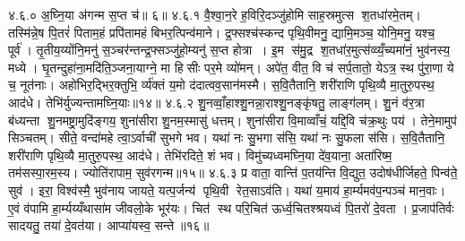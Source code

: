४.६.०
अ॒घ्नि॒या अ॑गन्म स॒प्त च॑॥ ६॥
४.६.१
वै॒श्वा॒न॒रे ह॒विरि॒दञ्जु॑होमि साह॒स्रमुत्स श॒तधा॑रमे॒तम्। तस्मि॑न्ने॒ष पि॒तरं॑ पिताम॒हं प्रपि॑तामहं बिभर॒त्पिन्व॑माने। द्र॒फ्सश्च॑स्कन्द पृथि॒वीमनु॒ द्यामि॒मञ्च॒ योनि॒मनु॒ यश्च॒ पूर्व॑। तृ॒तीय॒य्योंनि॒मनु॑ स॒ञ्चर॑न्तन्द्र॒फ्सञ्जु॑हो॒म्यनु॑ स॒प्त होत्रा। इ॒म स॑मु॒द्र श॒तधा॑र॒मुत्स॑व्व्यँ॒च्यमा॑नं॒ भुव॑नस्य॒ मध्ये। घृ॒तन्दुहा॑ना॒मदि॑ति॒ञ्जना॒याग्ने॒ मा हिसीः पर॒मे व्यो॑मन्। अपे॑त॒ वीत॒ वि च॑ सर्प॒तातो॒ येऽत्र॒ स्थ पु॑रा॒णा ये च॒ नूत॑नाः। अहो॑भिर॒द्भिर॒क्तुभि॒ र्व्य॑क्तं य॒मो द॑दात्वव॒सान॑मस्मै। स॒वि॒तैतानि॒ शरी॑राणि पृथि॒व्यै मा॒तुरु॒पस्थ॒ आद॑धे। तेभि॑र्युज्यन्तामघ्नि॒याः॥१४॥
४.६.२
शु॒नव्वाँ॒हाश्शु॒नन्ना॒राश्शु॒नङ्कृ॑षतु॒ लाङ्ग॑लम्। शु॒नं व॑र॒त्रा ब॑ध्यन्ता शु॒नमष्ट्रा॒मुदि॑ङ्गय॒ शुना॑सीरा शु॒नम॒स्मासु॑ धत्तम्। शुना॑सीरा वि॒माव्वाँचं॒ यद्दि॒वि च॑क्र॒थुः पय॑। तेने॒मामुप॑ सिञ्चतम्। सीते॒ वन्दा॑महे त्वा॒ऽर्वाची॑ सुभगे भव। यथा॑ नः सु॒भगा स॑सि॒ यथा॑ नः सु॒फला स॑सि। स॒वि॒तैतानि॒ शरी॑राणि पृथि॒व्यै मा॒तुरु॒पस्थ॒ आद॑धे। तेभि॑रदिते॒ शं भव। विमु॑च्यध्वमघ्नि॒या दे॑व॒याना॒ अता॑रिष्म॒ तम॑सस्पा॒रम॒स्य। ज्योति॑रापाम॒ सुव॑रगन्म॥१५॥
४.६.३
प्र वाता॒ वान्ति॑ प॒तय॑न्ति वि॒द्युत॒ उदोष॑धीर्जिहते॒ पिन्व॑ते॒ सुव॑। इरा॒ विश्व॑स्मै॒ भुव॑नाय जायते॒ यत्प॒र्जन्य॑ पृथि॒वी रेत॒साऽव॑ति। यथा॑ य॒माय॑ हा॒र्म्यमव॑प॒न्पञ्च॑ मान॒वाः। ए॒वं व॑पामि हा॒र्म्यय्यँथासा॑म जीवलो॒के भूर॑यः। चित॑ स्थ परि॒चित॑ ऊर्ध्व॒चितश्श्रयध्वं पि॒तरो॑ दे॒वता। प्र॒जाप॑तिर्वः सादयतु॒ तया॑ दे॒वत॑या। आप्या॑यस्व॒ सन्ते॥१६॥
\anuvakamend

